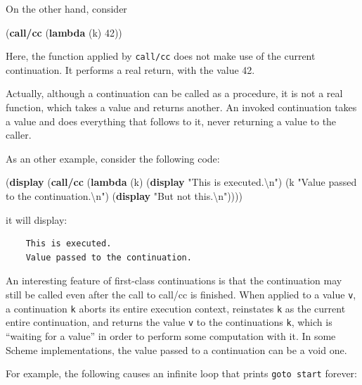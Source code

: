 \documentclass[12pt,a4paper,oneside,openright]{book}
\newenvironment{Shaded}{\begin{snugshade}}{\end{snugshade}}
\newcommand{\KeywordTok}[1]{\textcolor[rgb]{0.13,0.29,0.53}{\textbf{{#1}}}}
\newcommand{\DecValTok}[1]{\textcolor[rgb]{0.00,0.00,0.81}{{#1}}}
\newcommand{\StringTok}[1]{\textcolor[rgb]{0.31,0.60,0.02}{{#1}}}
\newcommand{\NormalTok}[1]{{#1}}
\begin{document}
On the other hand, consider

\begin{Shaded}
\begin{Highlighting}[]
    \NormalTok{(}\KeywordTok{call/cc}
      \NormalTok{(}\KeywordTok{lambda} \NormalTok{(k) }\DecValTok{42}\NormalTok{))}
\end{Highlighting}
\end{Shaded}

Here, the function applied by \texttt{call/cc} does not make use of the
current continuation. It performs a real return, with the value 42.

Actually, although a continuation can be called as a procedure, it is
not a real function, which takes a value and returns another. An invoked
continuation takes a value and does everything that follows to it, never
returning a value to the caller.

As an other example, consider the following code:

\begin{Shaded}
\begin{Highlighting}[]
    \NormalTok{(}\KeywordTok{display}
        \NormalTok{(}\KeywordTok{call/cc} \NormalTok{(}\KeywordTok{lambda} \NormalTok{(k)}
              \NormalTok{(}\KeywordTok{display} \StringTok{"This is executed.\textbackslash{}n"}\NormalTok{)}
              \NormalTok{(k }\StringTok{"Value passed to the continuation.\textbackslash{}n"}\NormalTok{)}
              \NormalTok{(}\KeywordTok{display} \StringTok{"But not this.\textbackslash{}n"}\NormalTok{))))}
\end{Highlighting}
\end{Shaded}

it will display:

\begin{verbatim}
    This is executed.
    Value passed to the continuation.
\end{verbatim}

An interesting feature of first-class continuations is that the
continuation may still be called even after the call to call/cc is
finished. When applied to a value \texttt{v}, a continuation \texttt{k}
aborts its entire execution context, reinstates \texttt{k} as the
current entire continuation, and returns the value \texttt{v} to the
continuations \texttt{k}, which is ``waiting for a value'' in order to
perform some computation with it. In some Scheme implementations, the
value passed to a continuation can be a void one.

For example, the following causes an infinite loop that prints
\texttt{goto\ start} forever:
\end{document}

